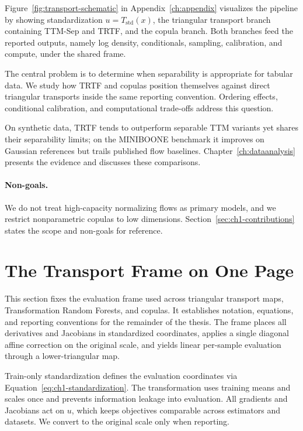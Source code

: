 \documentclass[11pt,a4paper,twoside]{book}\usepackage[]{graphicx}\usepackage[]{xcolor}
\begin{document}
Figure~\ref{fig:transport-schematic} in Appendix~\ref{ch:appendix} visualizes the pipeline by showing standardization $u = T_{\text{std}}(x)$, the triangular transport branch containing TTM-Sep and TRTF, and the copula branch. Both branches feed the reported outputs, namely log density, conditionals, sampling, calibration, and compute, under the shared frame.

The central problem is to determine when separability is appropriate for tabular data. We study how TRTF and copulas position themselves against direct triangular transports inside the same reporting convention. Ordering effects, conditional calibration, and computational trade-offs address this question.
\medskip

On synthetic data, TRTF tends to outperform separable TTM variants yet shares their separability limits; on the MINIBOONE benchmark it improves on Gaussian references but trails published flow baselines. Chapter~\ref{ch:dataanalysis} presents the evidence and discusses these comparisons.

\paragraph{Non-goals.} We do not treat high-capacity normalizing flows as primary models, and we restrict nonparametric copulas to low dimensions. Section~\ref{sec:ch1-contributions} states the scope and non-goals for reference.

\section{The Transport Frame on One Page}\label{sec:ch1-frame}
This section fixes the evaluation frame used across triangular transport maps, Transformation Random Forests, and copulas. It establishes notation, equations, and reporting conventions for the remainder of the thesis. The frame places all derivatives and Jacobians in standardized coordinates, applies a single diagonal affine correction on the original scale, and yields linear per-sample evaluation through a lower-triangular map.

Train-only standardization defines the evaluation coordinates via Equation~\eqref{eq:ch1-standardization}. The transformation uses training means and scales once and prevents information leakage into evaluation. All gradients and Jacobians act on $u$, which keeps objectives comparable across estimators and datasets. We convert to the original scale only when reporting.
\medskip
\end{document}
